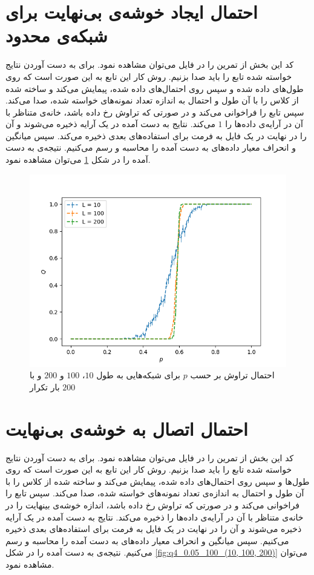 \documentclass[11pt, a4paper]{article}
\begin{document}
\section{\textbf{احتمال ایجاد خوشه‌ی بی‌نهایت برای شبکه‌ی محدود}}
کد این بخش از تمرین را در فایل
می‌توان مشاهده نمود.
برای به دست‌ آوردن نتایج خواسته شده تابع
را باید صدا بزنیم.
روش کار این تابع به این صورت است که روی طول‌های داده شده و سپس روی احتمال‌های داده شده،
پیمایش می‌کند و
ساخته شده از کلاس
را با آن طول و احتمال به اندازه تعداد نمونه‌های خواسته شده، صدا می‌کند.
سپس تابع
را فراخوانی می‌کند و در صورتی که تراوش رخ داده باشد، خانه‌ی متناظر با آن در آرایه‌ی داده‌ها را
$1$
می‌کند.
نتایج به دست آمده در یک آرایه ذخیره می‌شوند و آن را در نهایت در یک فایل به فرمت
برای استفاده‌های بعدی ذخیره می‌کند.
سپس میانگین و انحراف معیار داده‌های به دست آمده را محاسبه و رسم می‌کنیم.
نتیجه‌ی به دست آمده را در شکل
\ref{fig:q3_0.05_100_(10, 100, 200)}
می‌توان مشاهده نمود.

\begin{figure}[h]
  \centering
  \includegraphics[width=.7\textwidth]{q3_0.01_200_(10, 100, 200)}
  \caption{احتمال تراوش بر حسب $p$  برای شبکه‌هایی به طول $10$، $100$ و $200$ و با $200$ بار تکرار}
  \label{fig:q3_0.05_100_(10, 100, 200)}
\end{figure}


\section{\textbf{احتمال اتصال به خوشه‌ی بی‌نهایت}}
کد این بخش از تمرین را در فایل
می‌توان مشاهده نمود.
برای به دست‌ آوردن نتایج خواسته شده تابع
را باید صدا بزنیم.
روش کار این تابع به این صورت است که روی طول‌ها و سپس روی احتمال‌های داده شده،
پیمایش می‌کند و
ساخته شده از کلاس
را با آن طول و احتمال به اندازه‌ی تعداد نمونه‌های خواسته شده، صدا می‌کند.
سپس تابع
را فراخوانی می‌کند و در صورتی که تراوش رخ داده باشد،
اندازه خوشه‌ی بینهایت را در خانه‌ی متناظر با آن در آرایه‌ی داده‌ها را ذخیره می‌کند.
نتایج به دست آمده در یک آرایه ذخیره می‌شوند و آن را در نهایت در یک فایل به فرمت
برای استفاده‌های بعدی ذخیره می‌کنیم.
سپس میانگین و انحراف معیار داده‌های به دست آمده را محاسبه و رسم می‌کنیم.
نتیجه‌ی به دست آمده را در شکل
\ref{fig:q4_0.05_100_(10, 100, 200)}
می‌توان مشاهده نمود.
\end{document}
